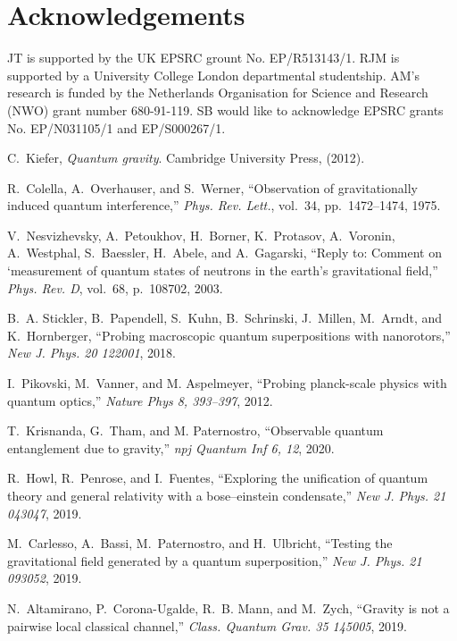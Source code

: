 \documentclass[%
 reprint,
 superscriptaddress,
 amsmath,
 amssymb,
 aps,
 longbibliography
]{revtex4-2}
\begin{document}
\section{Acknowledgements}
JT is supported by the UK EPSRC grount No. EP/R513143/1. RJM is supported by a University College London departmental studentship. AM’s research is funded by the Netherlands Organisation for Science and Research (NWO) grant number 680-91-119. SB would like to acknowledge EPSRC grants No. EP/N031105/1 and EP/S000267/1.


\begin{thebibliography}{10}

C.~Kiefer, {\em Quantum gravity}.
\newblock Cambridge University Press, (2012).

R.~Colella, A.~Overhauser, and S.~Werner, ``{Observation of gravitationally
  induced quantum interference},'' {\em Phys. Rev. Lett.}, vol.~34,
  pp.~1472--1474, 1975.

V.~Nesvizhevsky, A.~Petoukhov, H.~Borner, K.~Protasov, A.~Voronin, A.~Westphal,
  S.~Baessler, H.~Abele, and A.~Gagarski, ``{Reply to: Comment on `measurement
  of quantum states of neutrons in the earth's gravitational field},'' {\em
  Phys. Rev. D}, vol.~68, p.~108702, 2003.

B.~A. Stickler, B.~Papendell, S.~Kuhn, B.~Schrinski, J.~Millen, M.~Arndt, and
  K.~Hornberger, ``Probing macroscopic quantum superpositions with
  nanorotors,'' {\em New J. Phys. 20 122001}, 2018.

I.~Pikovski, M.~Vanner, and M. Aspelmeyer, ``Probing planck-scale physics
  with quantum optics,'' {\em Nature Phys 8, 393–397}, 2012.

T.~Krisnanda, G.~Tham, and M. Paternostro, ``Observable quantum
  entanglement due to gravity,'' {\em npj Quantum Inf 6, 12}, 2020.

R.~Howl, R.~Penrose, and I.~Fuentes, ``Exploring the unification of quantum
  theory and general relativity with a bose–einstein condensate,'' {\em New
  J. Phys. 21 043047}, 2019.

M.~Carlesso, A.~Bassi, M.~Paternostro, and H.~Ulbricht, ``Testing the
  gravitational field generated by a quantum superposition,'' {\em New J. Phys.
  21 093052}, 2019.

N.~Altamirano, P.~Corona-Ugalde, R.~B. Mann, and M.~Zych, ``Gravity is not a
  pairwise local classical channel,'' {\em Class. Quantum Grav. 35 145005},
  2019.


\end{thebibliography}
\end{document}
